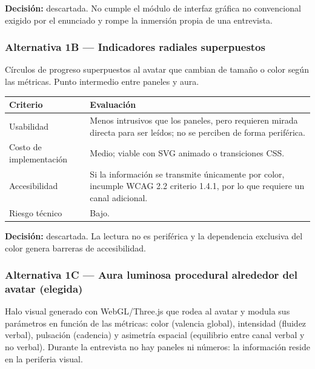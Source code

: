 \noindent\textbf{Decisión:} descartada. No cumple el módulo de
interfaz gráfica no convencional exigido por el enunciado y rompe la
inmersión propia de una entrevista.

\subsubsection*{Alternativa 1B — Indicadores radiales superpuestos}
Círculos de progreso superpuestos al avatar que cambian de tamaño o
color según las métricas. Punto intermedio entre paneles y aura.

\begin{table}[ht]
\centering\footnotesize
\renewcommand{\arraystretch}{1.2}
\begin{tabularx}{\linewidth}{@{}p{3.6cm} Y@{}}
\toprule
\textbf{Criterio} & \textbf{Evaluación} \\
\midrule
Usabilidad & Menos intrusivos que los paneles, pero requieren mirada
directa para ser leídos; no se perciben de forma periférica. \\
Costo de implementación & Medio; viable con SVG animado o
transiciones CSS. \\
Accesibilidad & Si la información se transmite únicamente por color,
incumple WCAG 2.2 criterio 1.4.1, por lo que requiere un canal
adicional. \\
Riesgo técnico & Bajo. \\
\bottomrule
\end{tabularx}
\end{table}

\noindent\textbf{Decisión:} descartada. La lectura no es periférica y
la dependencia exclusiva del color genera barreras de accesibilidad.

\subsubsection*{Alternativa 1C — Aura luminosa procedural alrededor del avatar (elegida)}
Halo visual generado con WebGL/Three.js que rodea al avatar y modula
sus parámetros en función de las métricas: color (valencia global),
intensidad (fluidez verbal), pulsación (cadencia) y asimetría
espacial (equilibrio entre canal verbal y no verbal). Durante la
entrevista no hay paneles ni números: la información reside en la
periferia visual.

